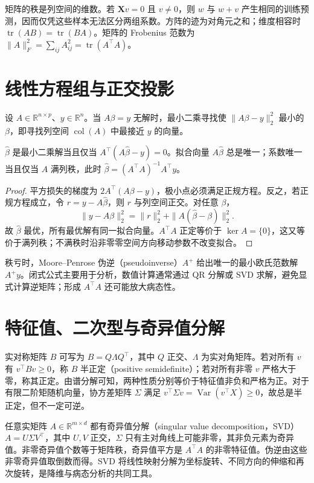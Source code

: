 \documentclass[UTF8,12pt,a4paper,fontset=fandol]{ctexbook}
\begin{document}
矩阵的秩是列空间的维数。若 $\mathbf Xv=0$ 且 $v\ne0$，则 $w$ 与 $w+v$ 产生相同的训练预测，因而仅凭这些样本无法区分两组系数。方阵的迹为对角元之和；维度相容时 $\operatorname{tr}(AB)=\operatorname{tr}(BA)$。矩阵的 Frobenius 范数为 $\|A\|_F^2=\sum_{ij}A_{ij}^2=\operatorname{tr}(A^\top A)$。

\section{线性方程组与正交投影}

设 $A\in\mathbb R^{n\times p}$、$y\in\mathbb R^n$。当 $A\beta=y$ 无解时，最小二乘寻找使 $\|A\beta-y\|_2^2$ 最小的 $\beta$，即寻找列空间 $\operatorname{col}(A)$ 中最接近 $y$ 的向量。
\begin{proposition}[最小二乘与正规方程]
$\widehat\beta$ 是最小二乘解当且仅当 $A^\top(A\widehat\beta-y)=0$。拟合向量 $A\widehat\beta$ 总是唯一；系数唯一当且仅当 $A$ 满列秩，此时 $\widehat\beta=(A^\top A)^{-1}A^\top y$。
\end{proposition}
\begin{proof}
平方损失的梯度为 $2A^\top(A\beta-y)$，极小点必须满足正规方程。反之，若正规方程成立，令 $r=y-A\widehat\beta$，则 $r$ 与列空间正交。对任意 $\beta$，
\[
 \|y-A\beta\|_2^2=\|r\|_2^2+\|A(\widehat\beta-\beta)\|_2^2.
\]
故 $\widehat\beta$ 最优，所有最优解有同一拟合向量。$A^\top A$ 正定等价于 $\ker A=\{0\}$，这又等价于满列秩；不满秩时沿非零零空间方向移动参数不改变拟合。
\end{proof}

秩亏时，Moore--Penrose 伪逆（pseudoinverse）$A^+$ 给出唯一的最小欧氏范数解 $A^+y$。闭式公式主要用于分析，数值计算通常通过 QR 分解或 SVD 求解，避免显式计算逆矩阵；形成 $A^\top A$ 还可能放大病态性。

\section{特征值、二次型与奇异值分解}

实对称矩阵 $B$ 可写为 $B=Q\Lambda Q^\top$，其中 $Q$ 正交、$\Lambda$ 为实对角矩阵。若对所有 $v$ 有 $v^\top Bv\geq0$，称 $B$ 半正定（positive semidefinite）；若对所有非零 $v$ 严格大于零，称其正定。由谱分解可知，两种性质分别等价于特征值非负和严格为正。对于有限二阶矩随机向量，协方差矩阵 $\Sigma$ 满足 $v^\top\Sigma v=\operatorname{Var}(v^\top X)\geq0$，故总是半正定，但不一定可逆。

任意实矩阵 $A\in\mathbb R^{m\times d}$ 都有奇异值分解（singular value decomposition，SVD）$A=U\Sigma V^\top$，其中 $U,V$ 正交，$\Sigma$ 只有主对角线上可能非零，其非负元素为奇异值。非零奇异值个数等于矩阵秩，奇异值平方是 $A^\top A$ 的非零特征值。伪逆由这些非零奇异值取倒数而得。SVD 将线性映射分解为坐标旋转、不同方向的伸缩和再次旋转，是降维与病态分析的共同工具。
\end{document}
